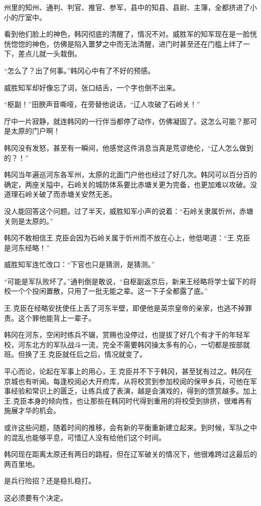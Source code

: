 州里的知州、通判、判官、推官、参军，县中的知县、县尉、主簿，全都挤进了小小的厅室中。

看到他们脸上的神色，韩冈彻底的清醒了，情况不对。威胜军的知军现在是一脸恍恍惚惚的神色，仿佛是陷入噩梦之中而无法清醒，进门时甚至还在门槛上绊了一下，差点儿就一头栽倒。

“怎么了？出了何事。”韩冈心中有了不好的预感。

威胜知军却好像忘了词，张口结舌，一个字也倒不出来。

“枢副！”田腴声音嘶哑，在旁替他说话，“辽人攻破了石岭关！”

厅中一片寂静，就连韩冈的一行伴当都停了动作，仿佛凝固了。这怎么可能？那可是太原的门户啊！

韩冈没有发怒，甚至有一瞬间，他感觉这件消息当真是荒谬绝伦，“辽人怎么做到的？！”

韩冈当年遍巡河东各军州，太原的北面门户他也经过了好几次。韩冈可以百分百的确定，两座关隘中，石岭关的城防体系要比赤塘关更为完备，也更加难以攻破。没道理石岭关破了而赤塘关安然无恙。

没人能回答这个问题。过了半天，威胜知军小声的说着：“石岭关隶属忻州，赤塘关则是太原的。”

韩冈不敢相信王.克臣会因为石岭关属于忻州而不放在心上，他低喝道：“王.克臣是河东经略！”

威胜知军连忙改口：“下官也只是猜测，是猜测。”

“可能是军队败坏了。”通判倒是敢说，“自枢副返京后，新来王经略将学士留下的将校一个个投闲置散，只用了一批无能之辈。这一下子全都露了底。”

王.克臣在经略安抚使任上丢了河东半壁，即便他是英宗皇帝的亲家，也逃不掉罪责。这个罪他能背上一辈子。

韩冈在河东，空闲时练兵不辍，赏赐也没停过，也提拔了好几个有才干的年轻军校，河东北方的军队战斗一流，完全不需要韩冈操太多有的心，一切都是按部就班。但换了王.克臣就任后之后，情况就变了。

平心而论，论起在军事上的用心，王.克臣并不下于韩冈，甚至犹有过之。韩冈在京城也有听闻。每逢校阅必大开府库，从将校赏到参加校阅的保甲乡兵，可他在军事经验和常识上的匮乏，让练兵成了表演，越是会演戏的，得到的馈赏越多。加上王.克臣本身的倾向性，也让那些在韩冈时代得到重用的将校受到排挤，很难再有施展才华的机会。

或许这些问题，随着时间的推移，会有新的平衡重新建立起来。到时候，军队之中的混乱也能够平息，可惜辽人没有给他们这个时间。

韩冈现在距离太原还有两日的路程，但在辽军破关的情况下，他很难跨过这最后的两百里地。

是兵行险招？还是稳扎稳打。

这必须要有个决定。
